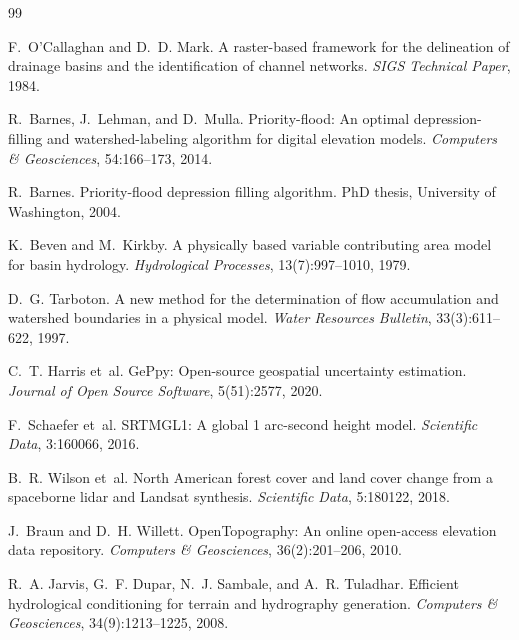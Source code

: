 \documentclass[sigconf,review,10pt]{acmart}
\begin{document}
\begin{thebibliography}{99}

F.~O'Callaghan and D.~D. Mark.
\newblock A raster-based framework for the delineation of drainage basins
  and the identification of channel networks.
\newblock \emph{SIGS Technical Paper}, 1984.

R.~Barnes, J.~Lehman, and D.~Mulla.
\newblock Priority-flood: An optimal depression-filling and watershed-labeling
  algorithm for digital elevation models.
\newblock \emph{Computers \& Geosciences}, 54:166--173, 2014.

R.~Barnes.
\newblock Priority-flood depression filling algorithm.
\newblock PhD thesis, University of Washington, 2004.

K.~Beven and M.~Kirkby.
\newblock A physically based variable contributing area model for basin
  hydrology.
\newblock \emph{Hydrological Processes}, 13(7):997--1010, 1979.

D.~G. Tarboton.
\newblock A new method for the determination of flow accumulation and
  watershed boundaries in a physical model.
\newblock \emph{Water Resources Bulletin}, 33(3):611--622, 1997.

C.~T. Harris et~al.
\newblock GePpy: Open-source geospatial uncertainty estimation.
\newblock \emph{Journal of Open Source Software}, 5(51):2577, 2020.

F.~Schaefer et~al.
\newblock SRTMGL1: A global 1 arc-second height model.
\newblock \emph{Scientific Data}, 3:160066, 2016.

B.~R. Wilson et~al.
\newblock North American forest cover and land cover change from a
  spaceborne lidar and Landsat synthesis.
\newblock \emph{Scientific Data}, 5:180122, 2018.

J.~Braun and D.~H. Willett.
\newblock OpenTopography: An online open-access elevation data repository.
\newblock \emph{Computers \& Geosciences}, 36(2):201--206, 2010.

R.~A. Jarvis, G.~F. Dupar, N.~J. Sambale, and A.~R. Tuladhar.
\newblock Efficient hydrological conditioning for terrain and hydrography
  generation.
\newblock \emph{Computers \& Geosciences}, 34(9):1213--1225, 2008.


\end{thebibliography}
\end{document}

